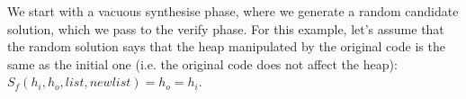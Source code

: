 \documentclass[runningheads,a4paper]{llncs}
\begin{document}


We start with a vacuous {\sc synthesise} phase,
where we generate a random candidate solution,
which we pass to the {\sc verify} phase. For this example,
let's assume that the random solution says that the heap manipulated by the original code
is the same 
as the initial one (i.e. the original code does not affect the heap):
$S_f(h_i,h_o,list,newlist) = h_o{=}h_i$.
\end{document}
